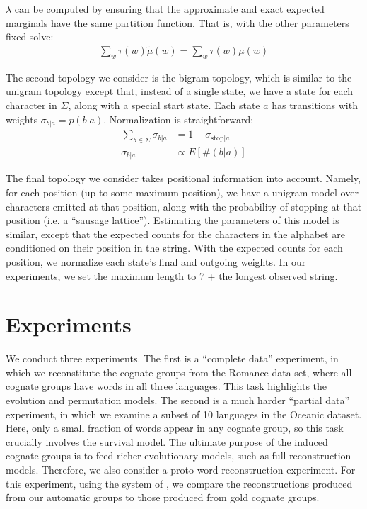 \documentclass[11pt,a4paper]{article}
\begin{document}
$\lambda$ can be computed by ensuring that the
approximate and exact expected marginals have the same partition
function. That is, with the other parameters fixed solve:
\begin{equation*}
  \begin{split}
    \sum_w \tau(w) \tilde\mu(w) = \sum_w \tau(w) \mu(w)
  \end{split}
\end{equation*}

The second topology we consider is the bigram topology, which is
similar to the unigram topology except that, instead of a single
state, we have a state for each character in $\Sigma$, along with
a special start state. Each state $a$ has transitions with weights
$\sigma_{b|a}= p(b|a)$. Normalization is straightforward:
\begin{equation*}
  \begin{split}
    \sum_{b\in\Sigma} \sigma_{b|a}&= 1-\sigma_{\mathrm{stop}|a} \\
    \sigma_{b|a} &\propto E[\#(b|a)]
   \end{split}
 \end{equation*}

The final topology we consider takes positional information into
account. Namely, for each position (up to some maximum position),
we have a unigram model over characters emitted at that position,
along with the probability of stopping at that position (i.e. a ``sausage lattice''). Estimating
the parameters of this model is similar, except that the expected
counts for the characters in the alphabet are conditioned on their
position in the string. With the expected counts for each position,
we normalize each state's final and outgoing weights. In our
experiments, we set the maximum length to 7 + the
longest observed string.

\section{Experiments}

We conduct three experiments. The first is a ``complete data''
experiment, in which we reconstitute the cognate groups from the
Romance data set, where all cognate groups have words in all three
languages.  This task highlights the evolution and permutation
models.  The second is a much harder ``partial data'' experiment,
in which we examine a subset of 10 languages in the Oceanic dataset.
Here, only a small fraction of words appear in any cognate group,
so this task crucially involves the survival model.  The ultimate
purpose of the induced cognate groups is to feed richer evolutionary
models, such as full reconstruction models.  Therefore, we also
consider a proto-word reconstruction experiment.  For this experiment,
using the system of , we compare the
reconstructions produced from our automatic groups to those produced
from gold cognate groups.
\end{document}
